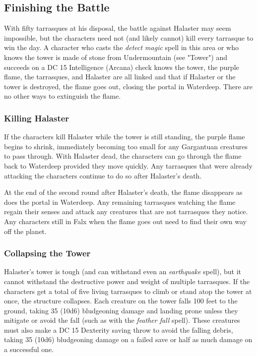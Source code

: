 \documentclass[10pt,a4paper,twoside,bg=print,twocolumn,openany,nodeprecatedcode]{dndbook}
\begin{document}
\subsection{Finishing the Battle}
With fifty tarrasques at his disposal, the battle against Halaster may seem impossible, but the characters need not (and likely cannot) kill every tarrasque to win the day. A character who casts the \textit{detect magic} spell in this area or who knows the tower is made of stone from Undermountain (see  "Tower") and succeeds on a DC 15 Intelligence (Arcana) check knows the tower, the purple flame, the tarrasques, and Halaster are all linked and that if Halaster or the tower is destroyed, the flame goes out, closing the portal in Waterdeep. There are no other ways to extinguish the flame.

\subsubsection{Killing Halaster}
If the characters kill Halaster while the tower is still standing, the purple flame begins to shrink, immediately becoming too small for any Gargantuan creatures to pass through. With Halaster dead, the characters can go through the flame back to Waterdeep provided they move quickly. Any tarrasques that were already attacking the characters continue to do so after Halaster's death.

At the end of the second round after Halaster's death, the flame disappears as does the portal in Waterdeep. Any remaining tarrasques watching the flame regain their senses and attack any creatures that are not tarrasques they notice. Any characters still in Falx when the flame goes out need to find their own way off the planet.

\subsubsection{Collapsing the Tower}
Halaster's tower is tough (and can withstand even an \textit{earthquake} spell), but it cannot withstand the destructive power and weight of multiple tarrasques. If the characters get a total of five living tarrasques to climb or stand atop the tower at once, the structure collapses. Each creature on the tower falls 100 feet to the ground, taking 35 (10d6) bludgeoning damage and landing prone unless they mitigate or avoid the fall (such as with the \textit{feather fall} spell). These creatures must also make a DC 15 Dexterity saving throw to avoid the falling debris, taking 35 (10d6) bludgeoning damage on a failed save or half as much damage on a successful one.
\end{document}
